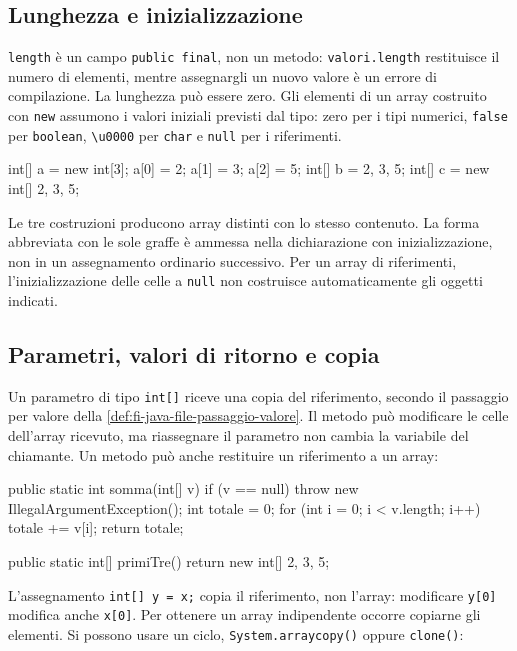 \subsection{Lunghezza e inizializzazione}
\label{sec:fi-java-array-inizializzazione}

\texttt{length} è un campo \texttt{public final}, non un metodo:
\texttt{valori.length} restituisce il numero di elementi,
mentre assegnargli un nuovo valore è un errore di compilazione.
La lunghezza può essere zero. Gli elementi di un array costruito
con \texttt{new} assumono i valori iniziali previsti dal tipo:
zero per i tipi numerici, \texttt{false} per \texttt{boolean},
\texttt{\textbackslash u0000} per \texttt{char} e \texttt{null} per i riferimenti.

\begin{unipdcode}[language=Java]
int[] a = new int[3];
a[0] = 2; a[1] = 3; a[2] = 5;
int[] b = {2, 3, 5};
int[] c = new int[] {2, 3, 5};
\end{unipdcode}

Le tre costruzioni producono array distinti con lo stesso contenuto.
La forma abbreviata con le sole graffe è ammessa nella dichiarazione
con inizializzazione, non in un assegnamento ordinario successivo.
Per un array di riferimenti, l'inizializzazione delle celle a
\texttt{null} non costruisce automaticamente gli oggetti indicati.

\subsection{Parametri, valori di ritorno e copia}
\label{sec:fi-java-array-parametri}

Un parametro di tipo \texttt{int[]} riceve una copia del riferimento,
secondo il passaggio per valore della
\cref{def:fi-java-file-passaggio-valore}. Il metodo può modificare
le celle dell'array ricevuto, ma riassegnare il parametro non cambia
la variabile del chiamante. Un metodo può anche restituire un
riferimento a un array:

\begin{unipdcode}[language=Java]
public static int somma(int[] v) {
    if (v == null) throw new IllegalArgumentException();
    int totale = 0;
    for (int i = 0; i < v.length; i++) totale += v[i];
    return totale;
}

public static int[] primiTre() {
    return new int[] {2, 3, 5};
}
\end{unipdcode}

L'assegnamento \texttt{int[] y = x;} copia il riferimento, non
l'array: modificare \texttt{y[0]} modifica anche \texttt{x[0]}.
Per ottenere un array indipendente occorre copiarne gli elementi.
Si possono usare un ciclo, \texttt{System.arraycopy()} oppure
\texttt{clone()}:

